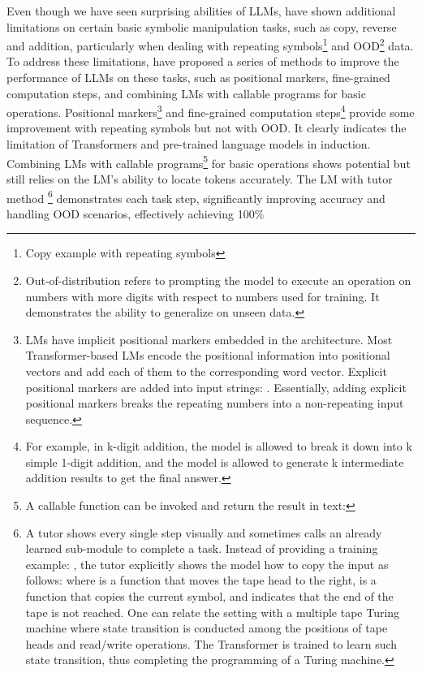 Even though we have seen surprising abilities of LLMs, \textcite{qian2022limitations} have shown additional limitations on certain basic symbolic manipulation tasks, such as copy, reverse and addition, particularly when dealing with repeating symbols\footnote{Copy example with repeating symbols } and OOD\footnote{Out-of-distribution refers to prompting the model to execute an operation on numbers with more digits with respect to numbers used for training. It demonstrates the ability to generalize on unseen data.} data.
To address these limitations, \textcite{qian2022limitations} have proposed a series of methods to improve the performance of LLMs on these tasks, such as positional markers, fine-grained computation steps, and combining LMs with callable programs for basic operations.
Positional markers\footnote{LMs have implicit positional markers embedded in the architecture. Most Transformer-based LMs encode the positional information into positional vectors and add each of
	them to the corresponding word vector. Explicit positional markers are added into input strings: .
	Essentially, adding explicit positional markers breaks the repeating numbers into a non-repeating input sequence.} and fine-grained computation steps\footnote{For example, in k-digit addition, the model is allowed to break it down into k simple 1-digit addition, and the model is allowed to generate k intermediate addition results to get the final answer.} provide some improvement with repeating symbols but not with OOD\@.
It clearly indicates the limitation of Transformers and pre-trained language models in induction.
Combining LMs with callable programs\footnote{A callable function  can be invoked and return the result in text: } for basic operations shows potential but still relies on the LM's ability to locate tokens accurately.
The LM with tutor method
\footnote{A tutor shows every single step visually and sometimes calls an already learned sub-module to complete a task. Instead of providing a training example: , the tutor explicitly shows the model how to copy the input as follows:  where  is a function that moves the tape head to the right,  is a function that copies the current symbol, and  indicates that the end of the tape is not reached. One can relate the setting with a multiple tape Turing machine where state transition is conducted among the positions of tape heads and read/write operations. The Transformer is trained to learn such state transition, thus completing the programming of a Turing machine.} demonstrates each task step, significantly improving accuracy and handling OOD scenarios, effectively achieving 100\% %

